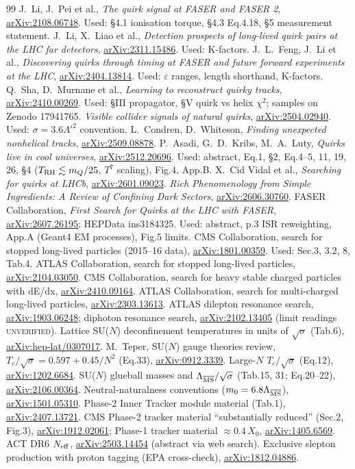 \documentclass[11pt,a4paper]{article}
\newcommand{\arx}[1]{\href{https://arxiv.org/abs/#1}{arXiv:#1}}
\newcommand{\UNV}{\textsc{unverified}}
\newcommand{\mQ}{m_Q}
\newcommand{\sqs}{\sqrt{\sigma}}
\begin{document}
\begin{thebibliography}{99}
 J.~Li, J.~Pei et al., \emph{The quirk signal at FASER and FASER 2}, \arx{2108.06748}. Used: \S4.1 ionisation torque, \S4.3 Eq.4.18, \S5 measurement statement.
 J.~Li, X.~Liao et al., \emph{Detection prospects of long-lived quirk pairs at the LHC far detectors}, \arx{2311.15486}. Used: K-factors.
 J.~L.~Feng, J.~Li et al., \emph{Discovering quirks through timing at FASER and future forward experiments at the LHC}, \arx{2404.13814}. Used: $\varepsilon$ ranges, length shorthand, K-factors.
 Q.~Sha, D.~Murnane et al., \emph{Learning to reconstruct quirky tracks}, \arx{2410.00269}. Used: \S III propagator, \S V quirk vs helix $\chi^2$; samples on Zenodo 17941765.
 \emph{Visible collider signals of natural quirks}, \arx{2504.02940}. Used: $\sigma=3.6\Lambda'^2$ convention.
 L.~Condren, D.~Whiteson, \emph{Finding unexpected nonhelical tracks}, \arx{2509.08878}.
 P.~Asadi, G.~D.~Kribs, M.~A.~Luty, \emph{Quirks live in cool universes}, \arx{2512.20696}. Used: abstract, Eq.1, \S2, Eq.4--5, 11, 19, 26, \S4 ($T_{\rm RH}\lesssim\mQ/25$, $T^7$ scaling), Fig.4, App.B.
 X.~Cid Vidal et al., \emph{Searching for quirks at LHCb}, \arx{2601.09023}.
 \emph{Rich Phenomenology from Simple Ingredients: A Review of Confining Dark Sectors}, \arx{2606.30760}.
 FASER Collaboration, \emph{First Search for Quirks at the LHC with FASER}, \arx{2607.26195}; HEPData ins3184325. Used: abstract, p.3 ISR reweighting, App.A (Geant4 EM processes), Fig.5 limits.
 CMS Collaboration, search for stopped long-lived particles (2015--16 data), \arx{1801.00359}. Used: Sec.3, 3.2, 8, Tab.4.
 ATLAS Collaboration, search for stopped long-lived particles, \arx{2104.03050}.
 CMS Collaboration, search for heavy stable charged particles with dE/dx, \arx{2410.09164}.
 ATLAS Collaboration, search for multi-charged long-lived particles, \arx{2303.13613}.
 ATLAS dilepton resonance search, \arx{1903.06248}; diphoton resonance search, \arx{2102.13405} (limit readings \UNV{}).
 Lattice SU($N$) deconfinement temperatures in units of $\sqs$ (Tab.6), \arx{hep-lat/0307017}.
 M.~Teper, SU($N$) gauge theories review, $T_c/\sqs=0.597+0.45/N^2$ (Eq.33), \arx{0912.3339}.
 Large-$N$ $T_c/\sqs$ (Eq.12), \arx{1202.6684}.
 SU($N$) glueball masses and $\Lambda_{\overline{\rm MS}}/\sqs$ (Tab.15, 31; Eq.20--22), \arx{2106.00364}.
 Neutral-naturalness conventions ($m_0=6.8\Lambda_{\overline{\rm MS}}$), \arx{1501.05310}.
 Phase-2 Inner Tracker module material (Tab.1), \arx{2407.13721}.
 CMS Phase-2 tracker material ``substantially reduced'' (Sec.2, Fig.3), \arx{1912.02061}; Phase-1 tracker material $\approx0.4\,X_0$, \arx{1405.6569}.
 ACT DR6 $N_{\rm eff}$, \arx{2503.14454} (abstract via web search).
 Exclusive slepton production with proton tagging (EPA cross-check), \arx{1812.04886}.
\end{thebibliography}
\end{document}
